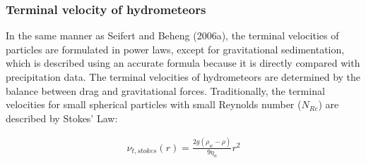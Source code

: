\begin{table}[h]
\begin{center}
\caption{Constant parameters chosen for the generalized gamma distribution; power law coefficients used for maximum dimensions and projected area, and ranges of lower- and upper limits of mean mass.}
\label{table_sn14-1}
\end{center}
\end{table}

\subsubsection{Terminal velocity of hydrometeors}
In the same manner as Seifert and Beheng (2006a), the terminal velocities of particles are formulated in power laws, except for gravitational sedimentation, which is described using an accurate formula because it is directly compared with precipitation data. The terminal velocities of hydrometeors are determined by the balance between drag and gravitational forces. Traditionally, the terminal velocities for small spherical particles with small Reynolds number ($N_{Re}$) are described by Stokes’ Law:

\begin{eqnarray}
\nu_{t,stokes}(r)=\frac{2g(\rho_{w}-\rho)}{9\eta_{a}}r^{2}
\label{sn12}
\end{eqnarray}

